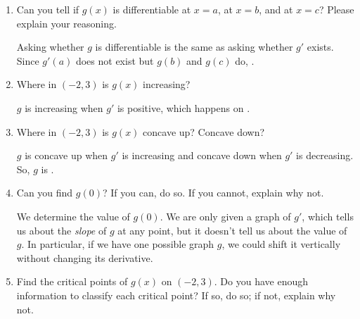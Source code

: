 \documentclass{article}
\theoremstyle{theorem}
\begin{document}
\begin{enumerate}
\begin{enumerate}
  \item
    \begin{problem}[\stretch{0.5}]
      Can you tell if $g(x)$ is differentiable at $x=a$, at $x=b$, and at
      $x=c$?  Please explain your reasoning.
    \end{problem}

    \begin{solution}
      Asking whether $g$ is differentiable is the same as asking whether $g'$ exists. Since $g'(a)$ does not exist but $g(b)$ and $g(c)$ do, .
    \end{solution}

  \item
    \begin{problem}[\nstretch{0.5}]
      Where in $(-2, 3)$ is $g(x)$ increasing?
    \end{problem}

    \begin{solution}
      $g$ is increasing when $g'$ is positive, which happens on .
    \end{solution}

  \item
    \begin{problem}[\stretch{0.5}]
      Where in $(-2, 3)$ is $g(x)$ concave up? Concave down? 
    \end{problem}

    \begin{solution}
      $g$ is concave up when $g'$ is increasing and concave down when $g'$ is decreasing. So, $g$ is . 
    \end{solution}

  \item
    \begin{problem}[\vfill]
      Can you find $g(0)$? If you can, do so. If you cannot, explain why not.
    \end{problem}

    \begin{solution}
      We  determine the value of $g(0)$. We are only given a graph of $g'$, which tells us about the \emph{slope} of $g$ at any point, but it doesn't tell us about the value of $g$. In particular, if we have one possible graph $g$, we could shift it vertically without changing its derivative.
    \end{solution}

  \item
    \begin{problem}[\vfill\newpage]
      Find the critical points of $g(x)$ on $(-2, 3)$. Do you have enough information to classify each critical point? If so, do so; if not, explain why not.
    \end{problem}


\end{enumerate}
\end{enumerate}
\end{document}

